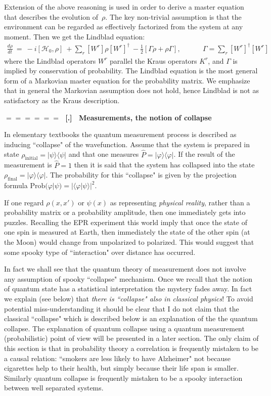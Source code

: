 \documentclass[onecolumn,fleqn]{revtex4}
\newcommand{\tbox}[1]{\text{#1}}
\newcommand{\beq}{\begin{eqnarray}}
\newcommand{\eeq}{\end{eqnarray}}
\renewcommand{\thesubsection}{\arabic{subsection}}
\renewcommand{\thesubsubsection}{\arabic{subsubsection}}
\newcommand{\sheadC}[1]
{
\addtocounter{subsubsection}{1}
\vspace{5mm}
{\Large\bf $=\!=\!=\!=\!=\!=\;$ [\thesubsection.\thesubsubsection] \ #1}  
\nopagebreak
\phantomsection
}
\begin{document}
Extension of the above reasoning is used in order to 
derive a master equation that describes the 
evolution of~$\rho$. The key non-trivial assumption 
is that the environment can be regarded as 
effectively factorized from the system at any moment.
Then we get the Lindblad equation:
\beq 
\frac{d\rho}{dt} \ = \  -i[\mathcal{H}_0,\rho] 
\ + \sum_r [W^r] \rho [W^r]^{\dagger} 
\ - \frac{1}{2}\left[\Gamma\rho + \rho \Gamma \right],
\ \ \ \ \ \ \ \ \ \ \ \ \ \ 
\Gamma=\sum_r [W^r]^{\dagger}[W^r]
\eeq
where the Lindblad operators $W^r$ parallel the Kraus operators $K^r$, 
and $\Gamma$ is implied by conservation of probability.
The Lindblad equation is the most general form of 
a Markovian master equation for the probability matrix.
We emphasize that in general the Markovian assumption 
does not hold, hence Lindblad is not as satisfactory as the Kraus description.  


\sheadC{Measurements, the notion of collapse}

In elementary textbooks the quantum measurement process 
is described as inducing ``collapse" of the wavefunction. 
Assume that the system is prepared in state 
${\rho_{\tbox{initial}}=|\psi\rangle \langle \psi|}$ and that one 
measures ${\hat{P}=|\varphi\rangle \langle \varphi|}$. If the result 
of the measurement is $\hat{P}=1$ then it is said 
that the system has collapsed into the 
state  ${\rho_{\tbox{final}}=|\varphi\rangle \langle \varphi|}$. 
The probability for this ``collapse" is given by the projection 
formula ${\mbox{Prob}(\varphi | \psi) = |\langle \varphi | \psi \rangle|^2}$.

If one regard $\rho(x,x')$ or $\psi(x)$ as representing {\em physical reality},  
rather than a probability matrix or a probability amplitude, 
then one immediately gets into puzzles. Recalling the EPR experiment 
this world imply that once the state of one spin is measured at Earth, 
then immediately the state of the other spin (at the Moon) 
would change from unpolarized to polarized.  This would suggest that 
some spooky type of ``interaction" over distance has occurred. 

In fact we shall see that the quantum theory of measurement 
does not involve any assumption of spooky ``collapse" mechanism. 
Once we recall that the notion of quantum state has 
a statistical interpretation the mystery fades away. 
In fact we explain (see below) that {\em there is ``collapse" also in classical physics}!
To avoid potential miss-understanding it should be clear 
that I do not claim that the classical ``collapse" 
which is described below is an explanation of the 
the quantum collapse. The explanation of quantum collapse  
using a quantum measurement (probabilistic) point of view will 
be presented in a later section. The only claim of this section 
is that in probability theory a correlation is frequently mistaken 
to be a causal relation: ``smokers are less likely to have Alzheimer" not because cigarettes 
help to their health, but simply because their life span is smaller. 
Similarly quantum collapse is frequently mistaken to 
be a spooky interaction between well separated systems.
   
\end{document}

